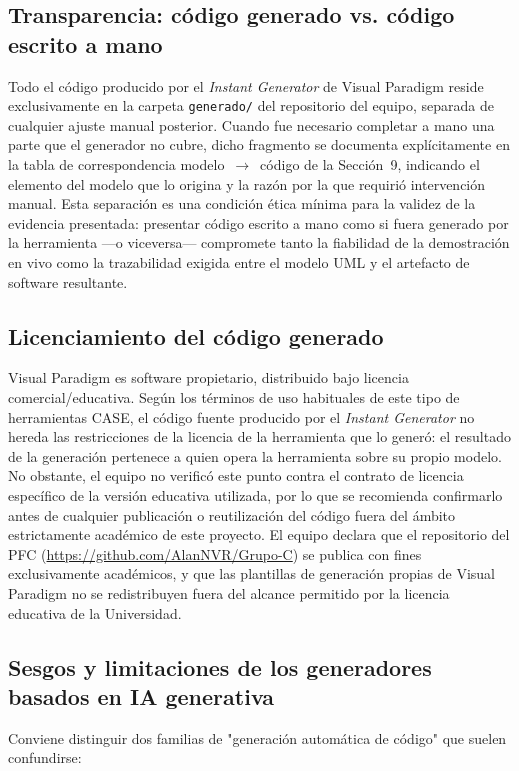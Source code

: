 \documentclass[11pt,a4paper]{article}
\begin{document}
\subsection{Transparencia: código generado vs. código escrito a mano}
\label{sec:transparencia}
Todo el código producido por el \textit{Instant Generator} de Visual Paradigm reside
exclusivamente en la carpeta \texttt{generado/} del repositorio del equipo, separada de
cualquier ajuste manual posterior. Cuando fue necesario completar a mano una parte que el
generador no cubre, dicho fragmento se documenta explícitamente en la tabla de
correspondencia modelo~$\rightarrow$~código de la Sección~9, indicando el elemento del modelo
que lo origina y la razón por la que requirió intervención manual. Esta separación es una
condición ética mínima para la validez de la evidencia presentada: presentar código escrito a
mano como si fuera generado por la herramienta —o viceversa— compromete tanto la
fiabilidad de la demostración en vivo como la trazabilidad exigida entre el modelo UML y el
artefacto de software resultante.

\subsection{Licenciamiento del código generado}
\label{sec:licenciamiento}
Visual Paradigm es software propietario, distribuido bajo licencia comercial/educativa. Según
los términos de uso habituales de este tipo de herramientas CASE, el código fuente producido
por el \textit{Instant Generator} no hereda las restricciones de la licencia de la herramienta que
lo generó: el resultado de la generación pertenece a quien opera la herramienta sobre su propio
modelo. No obstante, el equipo no verificó este punto contra el contrato de licencia específico
de la versión educativa utilizada, por lo que se recomienda confirmarlo antes de cualquier
publicación o reutilización del código fuera del ámbito estrictamente académico de este
proyecto. El equipo declara que el repositorio del PFC (\url{https://github.com/AlanNVR/Grupo-C})
se publica con fines exclusivamente académicos, y que las plantillas de generación propias de
Visual Paradigm no se redistribuyen fuera del alcance permitido por la licencia educativa de la
Universidad.

\subsection{Sesgos y limitaciones de los generadores basados en IA generativa}
\label{sec:sesgos-ia}
Conviene distinguir dos familias de "generación automática de código" que suelen confundirse:
 
\end{document}
